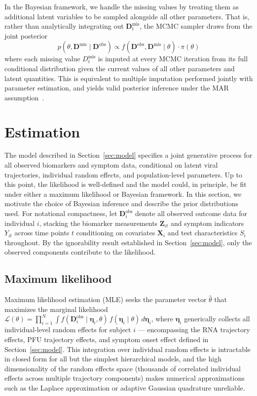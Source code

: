 \documentclass[12pt]{article}
\begin{document}
In the Bayesian framework, we handle the missing values by treating them as additional latent variables to be sampled alongside all other parameters. That is, rather than analytically integrating out $\mathbf{D}^{\text{mis}}_t$, the MCMC sampler draws from the joint posterior
\begin{equation*}
    p(\theta, \mathbf{D}^{\text{mis}} \mid \mathbf{D}^{\text{obs}}) \propto f(\mathbf{D}^{\text{obs}}, \mathbf{D}^{\text{mis}} \mid \theta) \cdot \pi(\theta)
\end{equation*}
where each missing value $D^{\text{mis}}_{t}$ is imputed at every MCMC iteration from its full conditional distribution given the current values of all other parameters and latent quantities. This is equivalent to multiple imputation performed jointly with parameter estimation, and yields valid posterior inference under the MAR assumption~\cite{gelman2013bayesian}.

\section{Estimation}

The model described in Section~\ref{sec:model} specifies a joint generative process for all observed biomarkers and symptom data, conditional on latent viral trajectories, individual random effects, and population-level parameters. Up to this point, the likelihood is well-defined and the model could, in principle, be fit under either a maximum likelihood or Bayesian framework. In this section, we motivate the choice of Bayesian inference and describe the prior distributions used. For notational compactness, let $\mathbf{D}_i^{\text{obs}}$ denote all observed outcome data for individual $i$, stacking the biomarker measurements $\mathbf{Z}_{it}$ and symptom indicators $Y_{it}$ across time points $t$ conditioning on covariates $\mathbf{X}_i$ and test characteristics $S_i$ throughout. By the ignorability result established in Section~\ref{sec:model}, only the observed components contribute to the likelihood.

\subsection{Maximum likelihood}

Maximum likelihood estimation (MLE) seeks the parameter vector $\hat\theta$ that maximizes the marginal likelihood $\mathcal{L}(\theta) = \prod_{i=1}^{N} \int f(\mathbf{D}_i^{\text{obs}} \mid \boldsymbol{\eta}_i, \theta)\, f(\boldsymbol{\eta}_i \mid \theta)\, d\boldsymbol{\eta}_i$, where $\boldsymbol{\eta}_i$ generically collects all individual-level random effects for subject $i$ --- encompassing the RNA trajectory effects, PFU trajectory effects, and symptom onset effect defined in Section~\ref{sec:model}. This integration over individual random effects is intractable in closed form for all but the simplest hierarchical models, and the high dimensionality of the random effects space (thousands of correlated individual effects across multiple trajectory components) makes numerical approximations such as the Laplace approximation or adaptive Gaussian quadrature unreliable.
\end{document}
